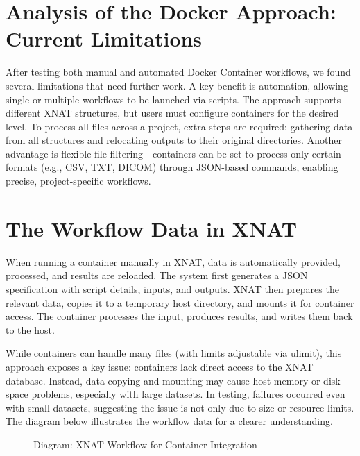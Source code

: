 \section{Analysis of the Docker Approach: Current Limitations}

After testing both manual and automated Docker Container workflows, we found several limitations that need further work. A key benefit is automation, allowing single or multiple workflows to be launched via scripts. The approach supports different XNAT structures, but users must configure containers for the desired level. To process all files across a project, extra steps are required: gathering data from all structures and relocating outputs to their original directories. Another advantage is flexible file filtering—containers can be set to process only certain formats (e.g., CSV, TXT, DICOM) through JSON-based commands, enabling precise, project-specific workflows.

\section{The Workflow Data in XNAT}

When running a container manually in XNAT, data is automatically provided, processed, and results are reloaded. The system first generates a JSON specification with script details, inputs, and outputs. XNAT then prepares the relevant data, copies it to a temporary host directory, and mounts it for container access. The container processes the input, produces results, and writes them back to the host.

While containers can handle many files (with limits adjustable via ulimit), this approach exposes a key issue: containers lack direct access to the XNAT database. Instead, data copying and mounting may cause host memory or disk space problems, especially with large datasets. In testing, failures occurred even with small datasets, suggesting the issue is not only due to size or resource limits.
The diagram below illustrates the workflow data for a clearer understanding.  
\begin{figure}[ht]
    \centering
    \def\svgwidth{\linewidth} 
    
    \caption{Diagram: XNAT Workflow for Container Integration}
    \label{fig:workflowxnat}
\end{figure}

